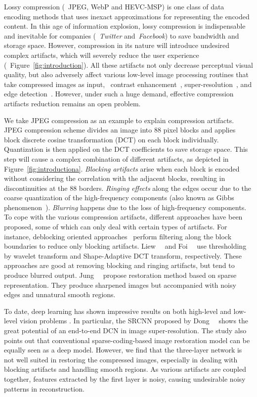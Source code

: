 \documentclass[10pt,twocolumn,letterpaper]{article}
\begin{document}
Lossy compression (\eg~JPEG, WebP and HEVC-MSP) is one class of data encoding methods that uses inexact approximations for representing the encoded content. In this age of information explosion, lossy compression is indispensable and inevitable for companies (\eg~\textit{Twitter} and~\textit{Facebook}) to save bandwidth and storage space. However, compression in its nature will introduce undesired complex artifacts, which will severely reduce the user experience (\eg~Figure~\ref{fig:introduction}). All these artifacts not only decrease perceptual visual quality, but also adversely affect various low-level image processing routines that take compressed images as input, \eg~contrast enhancement~\cite{Li2014}, super-resolution~\cite{Yang2014,Dong2014}, and edge detection~\cite{Dollar2013}. However, under such a huge demand, effective compression artifacts reduction remains an open problem.

We take JPEG compression as an example to explain compression artifacts.
JPEG compression scheme divides an image into 88 pixel blocks and applies block discrete cosine transformation (DCT) on each block individually. Quantization is then applied on the DCT coefficients to save storage space. This step will cause a complex combination of different artifacts, as depicted in Figure~\ref{fig:introductiona}.
\textit{Blocking artifacts} arise when each block is encoded without considering the correlation with the adjacent blocks, resulting in discontinuities at the 88 borders.
\textit{Ringing effects} along the edges occur due to the coarse quantization of the high-frequency components (also known as Gibbs phenomenon~\cite{Gonzalez2002}).
\textit{Blurring} happens due to the loss of high-frequency components.
To cope with the various compression artifacts, different approaches have been proposed, some of which can only deal with certain types of artifacts.
For instance, deblocking oriented approaches~\cite{List2003,ReeveIII1984,Wang2013} perform filtering along the block boundaries to reduce only blocking artifacts. Liew~\etal~\cite{Liew2004} and Foi~\etal~\cite{Foi2007} use thresholding by wavelet transform and Shape-Adaptive DCT transform, respectively. These approaches are good at removing blocking and ringing artifacts, but tend to produce blurred output. Jung~\etal~\cite{Jung2012} propose restoration method based on sparse representation. They produce sharpened images but accompanied with noisy edges and unnatural smooth regions. 

To date, deep learning has shown impressive results on both high-level and low-level vision problems . In particular, the SRCNN proposed by Dong~\etal~\cite{Dong2014} shows the great potential of an end-to-end DCN in image super-resolution. The study also points out that conventional sparse-coding-based image restoration model can be equally seen as a deep model. However, we find that the three-layer network is not well suited in restoring the compressed images, especially in dealing with blocking artifacts and handling smooth regions. As various artifacts are coupled together, features extracted by the first layer is noisy, causing undesirable noisy patterns in reconstruction.
\end{document}
